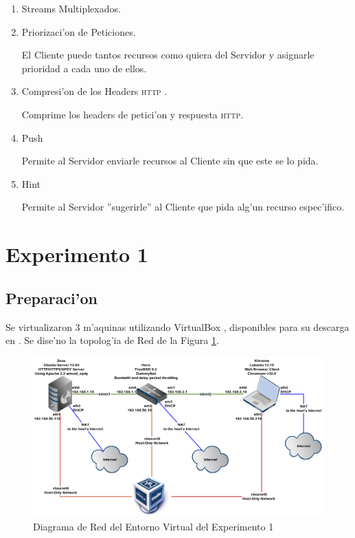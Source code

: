 \documentclass[a4paper,11pt,twocolumn]{article}
\begin{document}
\begin{enumerate}

\item Streams Multiplexados.

\item Priorizaci'on de Peticiones.

El Cliente puede tantos recursos como quiera del Servidor y asignarle prioridad a cada uno de ellos.

\item Compresi'on de los Headers \textsc{http} \cite{headersHTTP}.

Comprime los headers de petici'on y respuesta \textsc{http}.

\item Push

Permite al Servidor enviarle recursos al Cliente sin que este se lo pida.

\item Hint

Permite al Servidor ''sugerirle'' al Cliente que pida alg'un recurso espec'ifico.

\end{enumerate}

\section{Experimento 1}
\label{experimento1}
\subsection{Preparaci'on}

Se virtualizaron 3 m'aquinas utilizando VirtualBox \cite{virtualBox}, disponibles para su descarga en \cite{maqVirtuales}.
Se dise'no la topolog'ia de Red de la Figura \ref{diagramavms}.

\begin{figure}[ht]
  \centering\includegraphics[scale=0.5]{diagramavms}
  \caption{Diagrama de Red del Entorno Virtual del Experimento 1}
  \label{diagramavms}
\end{figure}
\end{document}
